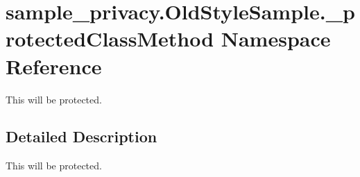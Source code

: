 \hypertarget{namespacesample__privacy_1_1_old_style_sample_1_1__protected_class_method}{\section{sample\-\_\-privacy.\-Old\-Style\-Sample.\-\_\-protected\-Class\-Method Namespace Reference}
\label{namespacesample__privacy_1_1_old_style_sample_1_1__protected_class_method}
}


This will be protected.  




\subsection{Detailed Description}
This will be protected. 